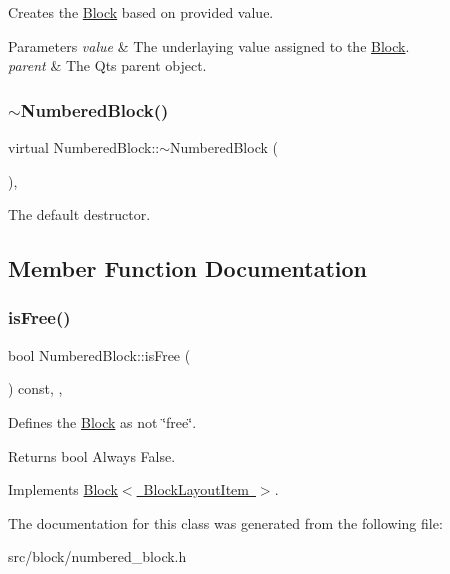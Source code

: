 Creates the \mbox{\hyperlink{class_block}{Block}} based on provided value. 


\begin{DoxyParams}{Parameters}
{\em value} & The underlaying value assigned to the \mbox{\hyperlink{class_block}{Block}}. \\
\hline
{\em parent} & The Qt\textquotesingle{}s parent object. \\
\hline
\end{DoxyParams}
\mbox{\label{class_numbered_block_aa7724b741079dbba2a507988bf669aaa}} 
\subsubsection{\texorpdfstring{$\sim$NumberedBlock()}{~NumberedBlock()}}
{\footnotesize\ttfamily virtual Numbered\+Block\+::$\sim$\+Numbered\+Block (\begin{DoxyParamCaption}{ }\end{DoxyParamCaption})\hspace{0.3cm}{\ttfamily [virtual]}, {\ttfamily [default]}}



The default destructor. 



\subsection{Member Function Documentation}
\mbox{\label{class_numbered_block_a04899b0e9d90f4ce4faa8aae9e4140e9}} 
\subsubsection{\texorpdfstring{isFree()}{isFree()}}
{\footnotesize\ttfamily bool Numbered\+Block\+::is\+Free (\begin{DoxyParamCaption}{ }\end{DoxyParamCaption}) const\hspace{0.3cm}{\ttfamily [inline]}, {\ttfamily [override]}, {\ttfamily [virtual]}}



Defines the \mbox{\hyperlink{class_block}{Block}} as not \char`\"{}free\char`\"{}. 

\begin{DoxyReturn}{Returns}
bool Always False. 
\end{DoxyReturn}


Implements \mbox{\hyperlink{class_block_a795e0536746b840286cb1e74487311a9}{Block$<$ Block\+Layout\+Item $>$}}.



The documentation for this class was generated from the following file\+:\begin{DoxyCompactItemize}
\item 
src/block/numbered\+\_\+block.\+h\end{DoxyCompactItemize}
